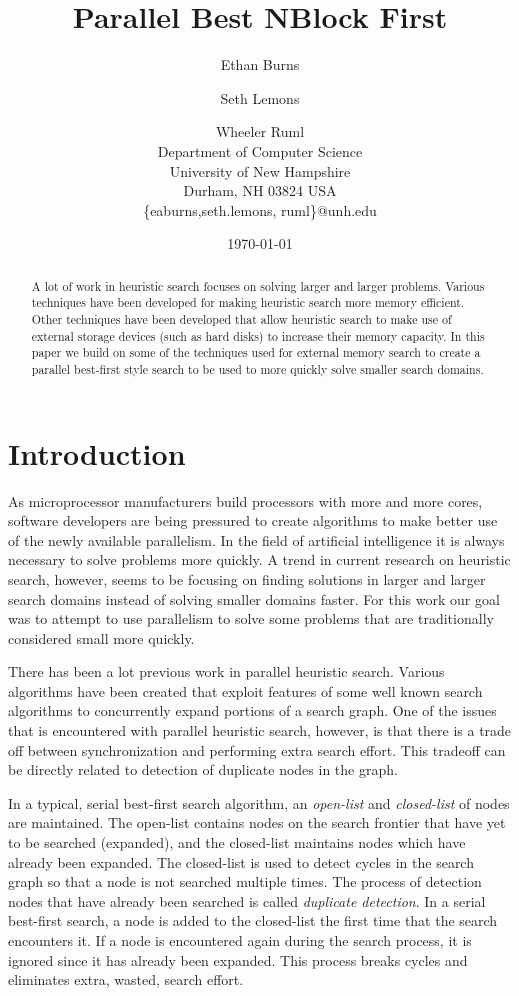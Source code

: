 \documentclass{article}
\title{Parallel Best NBlock First}
\author{Ethan Burns \and Seth Lemons \and Wheeler Ruml \\
  Department of Computer Science \\
  University of New Hampshire \\
  Durham, NH 03824 USA \\
  \{eaburns,seth.lemons, ruml\}@unh.edu}
\date{\today}
\begin{document}
\maketitle

\begin{abstract}
  A lot of work in heuristic search focuses on solving larger and larger
  problems.  Various techniques have been developed for making heuristic
  search more memory efficient.  Other techniques have been developed
  that allow heuristic search to make use of external storage devices
  (such as hard disks) to increase their memory capacity.  In this paper
  we build on some of the techniques used for external memory search to
  create a parallel best-first style search to be used to more quickly
  solve smaller search domains.
\end{abstract}

\section{Introduction}

As microprocessor manufacturers build processors with more and more
cores, software developers are being pressured to create algorithms to
make better use of the newly available parallelism.  In the field of
artificial intelligence it is always necessary to solve problems more
quickly.  A trend in current research on heuristic search, however,
seems to be focusing on finding solutions in larger and larger search
domains instead of solving smaller domains faster.  For this work our
goal was to attempt to use parallelism to solve some problems that are
traditionally considered small more quickly.

There has been a lot previous work in parallel heuristic search.
Various algorithms have been created that exploit features of some
well known search algorithms to concurrently expand portions of a
search graph.  One of the issues that is encountered with parallel
heuristic search, however, is that there is a trade off between
synchronization and performing extra search effort.  This tradeoff can
be directly related to detection of duplicate nodes in the graph.

In a typical, serial best-first search algorithm, an \emph{open-list}
and \emph{closed-list} of nodes are maintained.  The open-list
contains nodes on the search frontier that have yet to be searched
(expanded), and the closed-list maintains nodes which have already
been expanded.  The closed-list is used to detect cycles in the search
graph so that a node is not searched multiple times.  The process of
detection nodes that have already been searched is called
\emph{duplicate detection}.  In a serial best-first search, a node is
added to the closed-list the first time that the search encounters it.
If a node is encountered again during the search process, it is
ignored since it has already been expanded.  This process breaks
cycles and eliminates extra, wasted, search effort.
\end{document}

